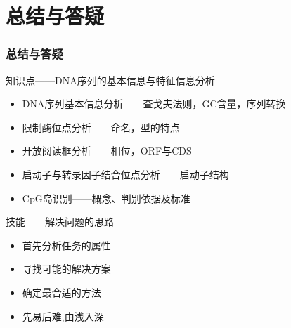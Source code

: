 \section{总结与答疑}
\begin{frame}
  \frametitle{总结与答疑}
  \begin{block}{知识点——DNA序列的基本信息与特征信息分析}
    \begin{itemize}
      \item DNA序列基本信息分析——查戈夫法则，GC含量，序列转换
      \item 限制酶位点分析——命名，型的特点
      \item 开放阅读框分析——相位，ORF与CDS
      \item 启动子与转录因子结合位点分析——启动子结构
      \item CpG岛识别——概念、判别依据及标准
    \end{itemize}
  \end{block}
  \begin{block}{技能——解决问题的思路}
    \begin{itemize}
      \item 首先分析任务的属性
      \item 寻找可能的解决方案
      \item 确定最合适的方法
      \item 先易后难,由浅入深
    \end{itemize}
  \end{block}
\end{frame}
